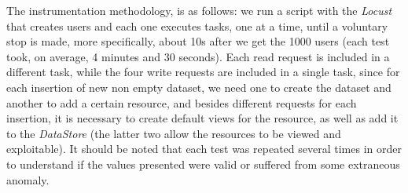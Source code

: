   \label{tab:request_factors}

  The instrumentation methodology, is as follows: we run a script with the \textit{Locust} that creates users and each one executes tasks, one at a time, until a voluntary stop is made, more specifically, about 10s after we get the 1000 users (each test took, on average, 4 minutes and 30 seconds). Each read request is included in a different task, while the four write requests are included in a single task, since for each insertion of new non empty dataset, we need one to create the dataset and another to add a certain resource, and besides different requests for each insertion, it is necessary to create default views for the resource, as well as add it to the \textit{DataStore} (the latter two allow the resources to be viewed and exploitable). It should be noted that each test was repeated several times in order to understand if the values presented were valid or suffered from some extraneous anomaly.
  
  \newpage